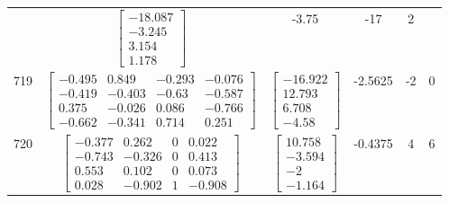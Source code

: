 \documentclass[a4paper,12pt]{article}
\begin{document}
\begin{tabular}{c c c c c c}
&
$\begin{bmatrix} -18.087 \\ -3.245 \\ 3.154 \\ 1.178 \end{bmatrix}$
&
-3.75
&
-17
&
2
\\
719
&
$\begin{bmatrix} -0.495 & 0.849 & -0.293 & -0.076 \\ -0.419 & -0.403 & -0.63 & -0.587 \\ 0.375 & -0.026 & 0.086 & -0.766 \\ -0.662 & -0.341 & 0.714 & 0.251 \end{bmatrix}$
&
$\begin{bmatrix} -16.922 \\ 12.793 \\ 6.708 \\ -4.58 \end{bmatrix}$
&
-2.5625
&
-2
&
0
\\
720
&
$\begin{bmatrix} -0.377 & 0.262 & 0 & 0.022 \\ -0.743 & -0.326 & 0 & 0.413 \\ 0.553 & 0.102 & 0 & 0.073 \\ 0.028 & -0.902 & 1 & -0.908 \end{bmatrix}$
&
$\begin{bmatrix} 10.758 \\ -3.594 \\ -2 \\ -1.164 \end{bmatrix}$
&
-0.4375
&
4
&
6
\\
\end{tabular} \egroup \newpage
\end{document}
